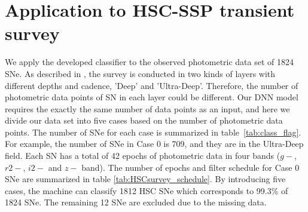\documentclass[useamsfonts]{pasj01}
\begin{document}
\section{Application to HSC-SSP transient survey}
\label{sec:h}
%
We apply the developed classifier to the observed photometric data set of 1824 SNe.
As described in \citet{yasuda19a}, the survey %
is conducted in two kinds of layers with different depths and cadence, 'Deep' and 'Ultra-Deep'.
Therefore, the number of photometric data points of SN in each layer could be different.
Our DNN model requires the exactly the same number of data points as an input, and here we divide
our data set into five cases based on the number of photometric data points.
The number of SNe for each case is summarized in table\ \ref{tab:class_flag}.
For example, the number of SNe in Case 0 is 709, and they are in the Ultra-Deep field.  Each SN has a total of 
42 epochs of photometric data in four bands ($g-$, $r2-$, $i2-$ and $z-$ band).
The number of epochs and filter schedule for Case 0 SNe are summarized in table \ref{tab:HSCsurvey_schedule}.
By introducing five cases, the machine can classify 1812 HSC SNe which corresponds to 99.3\% of 1824 SNe.
The remaining 12 SNe are excluded due to the missing data. 
%
\begin{table}[htbp]
\label{tab:class_flag}
\end{table}
%
%
\end{document}

